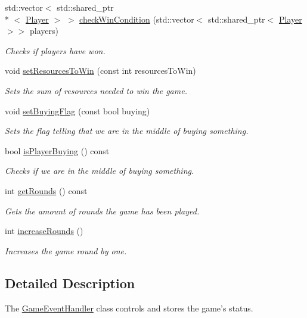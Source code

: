 \begin{DoxyCompactItemize}
std\-::vector$<$ std\-::shared\-\_\-ptr\\*
$<$ \hyperlink{classPlayer}{Player} $>$ $>$ \hyperlink{classGameEventHandler_aa5ad66ca2e396c97ad2f9328234cacd9}{check\-Win\-Condition} (std\-::vector$<$ std\-::shared\-\_\-ptr$<$ \hyperlink{classPlayer}{Player} $>$$>$ players)
\begin{DoxyCompactList}\small\item\em Checks if players have won. \end{DoxyCompactList}\item 
void \hyperlink{classGameEventHandler_a1c5d965a153cf81b0d594cf49625a4d9}{set\-Resources\-To\-Win} (const int resources\-To\-Win)
\begin{DoxyCompactList}\small\item\em Sets the sum of resources needed to win the game. \end{DoxyCompactList}\item 
void \hyperlink{classGameEventHandler_a23bc60e5d802eb151d0f227c3ec75d82}{set\-Buying\-Flag} (const bool buying)
\begin{DoxyCompactList}\small\item\em Sets the flag telling that we are in the middle of buying something. \end{DoxyCompactList}\item 
bool \hyperlink{classGameEventHandler_a682951eb61bb9653a1a84bd72ee8ea9f}{is\-Player\-Buying} () const 
\begin{DoxyCompactList}\small\item\em Checks if we are in the middle of buying something. \end{DoxyCompactList}\item 
int \hyperlink{classGameEventHandler_a8d8ce2069c3bc1e96ca8d6bbfca6786a}{get\-Rounds} () const 
\begin{DoxyCompactList}\small\item\em Gets the amount of rounds the game has been played. \end{DoxyCompactList}\item 
int \hyperlink{classGameEventHandler_a8ab76d633c0cc009e47639171df7b0bd}{increase\-Rounds} ()
\begin{DoxyCompactList}\small\item\em Increases the game round by one. \end{DoxyCompactList}\end{DoxyCompactItemize}


\subsection{Detailed Description}
The \hyperlink{classGameEventHandler}{Game\-Event\-Handler} class controls and stores the game's status. 

